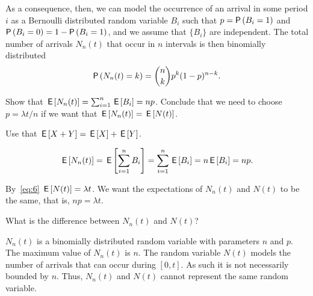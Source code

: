 As a consequence, then, we can model the occurrence of an arrival in
some period $i$ as a Bernoulli distributed random variable $B_i$ such
that $p=\P{B_i =1}$ and $\P{B_i=0} = 1-\P{B_i = 1}$, and we assume that
$\{B_i\}$ are independent. The total number of arrivals $N_n(t)$ that
occur in $n$ intervals is then binomially distributed
\begin{equation}\label{eq:bin}
  \P{N_n(t) = k} = {n \choose k} p^k (1-p)^{n-k}.
\end{equation}

\begin{exercise}{\faFlask}
Show that $\,\mathsf{E}\left[N_n(t)\right] = \sum_{i=1}^n \,\mathsf{E}\left[B_i\right] = n p$. Conclude that we need to choose $p = \lambda t/n$ if we want that $\,\mathsf{E}\left[N_n(t)\right] = \,\mathsf{E}\left[N(t)\right]$.
\begin{hint}
Use that $\,\mathsf{E}\left[X+Y\right] = \,\mathsf{E}\left[X\right] + \,\mathsf{E}\left[Y\right]$. 
\end{hint}
\begin{solution}
  \begin{equation*}
    \,\mathsf{E}\left[N_n(t)\right] = \,\mathsf{E}\left[\sum_{i=1}^n {B_i}\right] = \sum_{i=1}^n \,\mathsf{E}\left[B_i\right] = n \,\mathsf{E}\left[B_i\right] = n p.
  \end{equation*}

 By~\eqref{eq:6} $\,\mathsf{E}\left[N(t)\right] = \lambda t$.  We want the expectations of $N_n(t)$ and $N(t)$ to be the same,  that is, $n p = \lambda t$. 
\end{solution}
\end{exercise}

\begin{exercise}{\faFlask}
What is the difference between $N_n(t)$ and $N(t)$?
\begin{solution}
  $N_n(t)$ is a binomially distributed random variable with parameters
  $n$ and $p$. The maximum value of $N_n(t)$ is $n$. The random
  variable $N(t)$ models the number of arrivals that can occur during
  $[0,t]$. As such it is not necessarily bounded by $n$. Thus, $N_n(t)$ and $N(t)$ cannot represent the same random variable. 
\end{solution}
\end{exercise}




